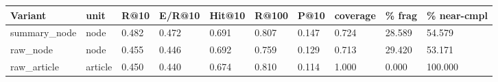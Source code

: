 \begin{tabular}{llllllllll}
\toprule
Variant & unit & R@10 & E/R@10 & Hit@10 & R@100 & P@10 & coverage & \% frag & \% near-cmpl \\
\midrule
summary_node & node & 0.482 & 0.472 & 0.691 & 0.807 & 0.147 & 0.724 & 28.589 & 54.579 \\
raw_node & node & 0.455 & 0.446 & 0.692 & 0.759 & 0.129 & 0.713 & 29.420 & 53.171 \\
raw_article & article & 0.450 & 0.440 & 0.674 & 0.810 & 0.114 & 1.000 & 0.000 & 100.000 \\
\bottomrule
\end{tabular}
